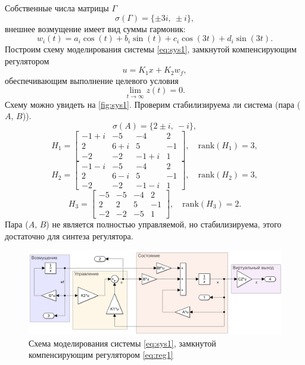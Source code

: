 Собственные числа матрицы $\Gamma$
\begin{equation*}
    \sigma(\Gamma)=\{\pm3i,\ \pm i\},
\end{equation*}
внешнее возмущение имеет вид суммы гармоник:
\begin{equation*}
    w_i(t)=a_i\cos(t)+b_i\sin(t) + c_i\cos(3t)+d_i\sin(3t).
\end{equation*}
Построим схему моделирования системы \eqref{eq:sys1},
замкнутой компенсирующим регулятором
\begin{equation}
    u=K_1x+K_2w_f,
    \label{eq:reg1}
\end{equation}
обеспечивающим выполнение целевого условия
\begin{equation*}
    \lim_{t\rightarrow\infty}z(t)=0.
\end{equation*}
Схему можно увидеть на \autoref{fig:sys1}.
Проверим стабилизируема ли система (пара ($A$, $B$)).
\begin{equation*}
    \sigma(A)=\{2\pm i,\ -i\},
\end{equation*}
\begin{equation*}
    H_1=\begin{bmatrix}
        -1 + i & -5 & -4 & 2 \\
        2 & 6 + i & 5 & -1 \\
        -2 & -2 & -1 + i & 1
    \end{bmatrix},\quad \text{rank}(H_1)=3,
\end{equation*}
\begin{equation*}
    H_2=\begin{bmatrix}
        -1 - i & -5 & -4 & 2 \\
        2 & 6 - i & 5 & -1 \\
        -2 & -2 & -1 - i & 1
    \end{bmatrix},\quad \text{rank}(H_2)=3,
\end{equation*}
\begin{equation*}
    H_3=\begin{bmatrix}
        -5 & -5 & -4 & 2 \\
        2 & 2 & 5 & -1 \\
        -2 & -2 & -5 & 1
    \end{bmatrix},\quad \text{rank}(H_3)=2.
\end{equation*}
Пара ($A$, $B$) не является полностью управляемой, но
стабилизируема, этого достаточно для синтеза регулятора.

\begin{figure}[H]
    \centering
    \includegraphics[width=\linewidth]{figs/task1_slx.png}
    \caption{Схема моделирования системы \eqref{eq:sys1},
    замкнутой компенсирующим регулятором \eqref{eq:reg1}}
    \label{fig:sys1}
\end{figure}

